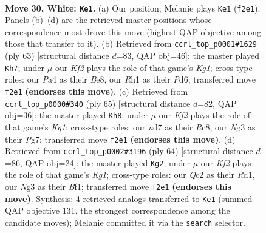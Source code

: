 \documentclass[11pt]{article}
\begin{document}
\clearpage

\begin{figure}[p]\centering
\begin{subfigure}{0.46\textwidth}\centering
\resizebox{\linewidth}{!}{%
\newchessgame
\chessboard[
  setfen={1rb3k1/p2n1r1p/5b2/2pq4/Pp1p1P2/1P4N1/R1Q1PK2/1NB4R w - - 6 30},
  showmover=false,
  pgfstyle=straightmove, color=movearrow, markmove={f2-e1}
]}
\caption{}
\end{subfigure}\hfill
\begin{subfigure}{0.46\textwidth}\centering
\resizebox{\linewidth}{!}{%
\newchessgame
\chessboard[
  setfen={r3b1k1/6p1/1qnp1p2/r3p3/1p2P2P/1P5P/PR1Q1PBK/2R1N3 b - - 0 32},
  showmover=false,
  pgfstyle=straightmove, color=movearrow, markmove={g8-h7}
]}
\caption{}
\end{subfigure}
\\[4pt]
\begin{subfigure}{0.46\textwidth}\centering
\resizebox{\linewidth}{!}{%
\newchessgame
\chessboard[
  setfen={2rb2k1/3r2p1/1np2p2/4p2p/1P2N1qP/2P3P1/Q2B1PK1/1R2R3 b - - 3 33},
  showmover=false,
  pgfstyle=straightmove, color=movearrow, markmove={g8-h8}
]}
\caption{}
\end{subfigure}\hfill
\begin{subfigure}{0.46\textwidth}\centering
\resizebox{\linewidth}{!}{%
\newchessgame
\chessboard[
  setfen={2rr1b2/p4p1k/2q1p2p/2P2p1N/1P1p4/PN3n1P/1Q3P2/1R1R1BK1 w - - 6 33},
  showmover=false,
  pgfstyle=straightmove, color=movearrow, markmove={g1-g2}
]}
\caption{}
\end{subfigure}
\caption{\textbf{Move 30, White: \texttt{Ke1}.} (a) Our position; Melanie plays \texttt{Ke1} (\texttt{f2e1}). Panels (b)--(d) are the retrieved master positions whose correspondence most drove this move (highest QAP objective among those that transfer to it). (b) Retrieved from \texttt{ccrl\_top\_p0001\#1629} (ply 63) [structural distance $d$=83, QAP obj=46]: the master played \texttt{Kh7}; under $\mu$ our \emph{Kf2} plays the role of that game's \emph{Kg1}; cross-type roles: our \emph{P}a4 as their \emph{B}e8, our \emph{R}h1 as their \emph{P}d6; transferred move \texttt{f2e1} \textbf{(endorses this move)}. (c) Retrieved from \texttt{ccrl\_top\_p0000\#340} (ply 65) [structural distance $d$=82, QAP obj=36]: the master played \texttt{Kh8}; under $\mu$ our \emph{Kf2} plays the role of that game's \emph{Kg1}; cross-type roles: our \emph{n}d7 as their \emph{R}c8, our \emph{N}g3 as their \emph{P}g7; transferred move \texttt{f2e1} \textbf{(endorses this move)}. (d) Retrieved from \texttt{ccrl\_top\_p0002\#3196} (ply 64) [structural distance $d$=86, QAP obj=24]: the master played \texttt{Kg2}; under $\mu$ our \emph{Kf2} plays the role of that game's \emph{Kg1}; cross-type roles: our \emph{Q}c2 as their \emph{R}d1, our \emph{N}g3 as their \emph{B}f1; transferred move \texttt{f2e1} \textbf{(endorses this move)}. Synthesis: 4 retrieved analogs transferred to \texttt{Ke1} (summed QAP objective 131, the strongest correspondence among the candidate moves); Melanie committed it via the \texttt{search} selector.}
\label{fig:thought-m58}
\end{figure}
\end{document}
